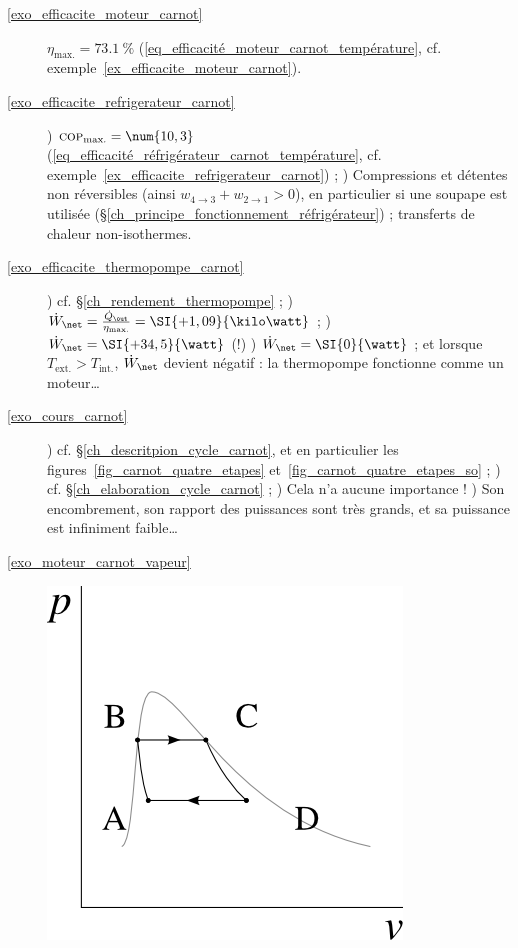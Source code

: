 \exercisesolutionpage
\titreresultats

	\begin{description}
		\item [\ref{exo_efficacite_moteur_carnot}]
					\tab $\eta_\text{max.} = \SI{73,1}{\percent}$ (\ref{eq_efficacité_moteur_carnot_température}, cf. exemple~\ref{ex_efficacite_moteur_carnot}).
		\item [\ref{exo_efficacite_refrigerateur_carnot}]
					) $\textsc{cop}_\text{max.} = \num{10,3}$ (\ref{eq_efficacité_réfrigérateur_carnot_température}, cf. exemple~\ref{ex_efficacite_refrigerateur_carnot}) ;
					) Compressions et détentes non réversibles (ainsi $w_{4\to 3} + w_{2\to 1} > 0$), en particulier si une soupape est utilisée (\S\ref{ch_principe_fonctionnement_réfrigérateur}) ; transferts de chaleur non-isothermes.
		\item [\ref{exo_efficacite_thermopompe_carnot}]
					) cf. \S\ref{ch_rendement_thermopompe}	;
					) $\dot W_\net = \frac{\dot Q_\out}{\eta_\text{max.}} = \SI{+1,09}{\kilo\watt}$ ;
					) $\dot W_\net = \SI{+34,5}{\watt}$ (!)
					) $\dot W_\net = \SI{0}{\watt}$ ; et lorsque $T_\text{ext.} > T_\text{int.}$, $\dot W_\net$ devient négatif : la thermopompe fonctionne comme un moteur…
		\item [\ref{exo_cours_carnot}]
					) cf. \S\ref{ch_descritpion_cycle_carnot}, et en particulier les figures~\ref{fig_carnot_quatre_etapes} et~\ref{fig_carnot_quatre_etapes_so} ;
					) cf. \S\ref{ch_elaboration_cycle_carnot} ;
					) Cela n’a aucune importance !
					) Son encombrement, son rapport des puissances sont très grands, et sa puissance est infiniment faible…
		\item [\ref{exo_moteur_carnot_vapeur}]
					\includegraphics[width=\solutiondiagramwidth]{images/exo_sol_pv_carnot_lv_1.png}

\end{description}
